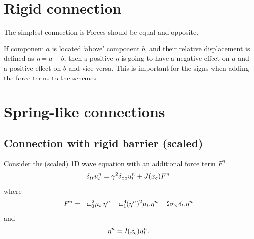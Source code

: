 \section{Rigid connection}
The simplest connection is Forces should be equal and opposite. 

If component $a$ is located `above' component $b$, and their relative displacement is defined as $\eta = a-b$, then a positive $\eta$ is going to have a negative effect on $a$ and a positive effect on $b$ and vice-versa. This is important for the signs when adding the force terms to the schemes. 

\section{Spring-like connections}

\subsection{Connection with rigid barrier (scaled)}
Consider the (scaled) 1D wave equation with an additional force term $F^n$
\begin{equation}\label{eq:1DwaveConnRigid}
    \delta_{tt} u_l^n = \gamma^2\delta_{xx} u_l^n + J(x_{\text{c}})F^n
\end{equation}
where
\begin{equation}\label{eq:1DwaveConnRigidForce}
    F^n = -\omega_0^2\mu_{t\cdot}\eta^n - \omega_1^4(\eta^n)^2\mu_{t\cdot}\eta^n - 2\sigma_\times \delta_{t\cdot} \eta^n
\end{equation}
and
\begin{equation}\label{eq:etaRigid}
    \eta^n = I(x_{\text{c}})u_l^n.
\end{equation}

